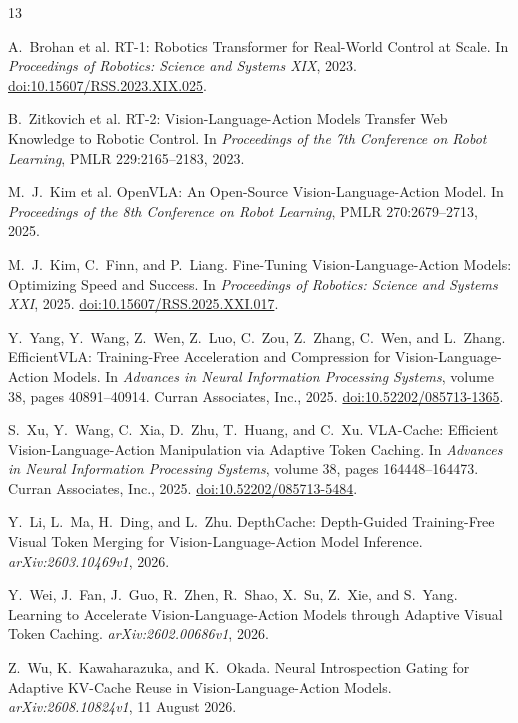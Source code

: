 \documentclass[11pt]{article}
\newcommand{\doi}[1]{\href{https://doi.org/#1}{doi:#1}}
\begin{document}
\begin{thebibliography}{13}

A.~Brohan et al.
\newblock RT-1: Robotics Transformer for Real-World Control at Scale.
\newblock In \emph{Proceedings of Robotics: Science and Systems XIX}, 2023.
\newblock \doi{10.15607/RSS.2023.XIX.025}.

B.~Zitkovich et al.
\newblock RT-2: Vision-Language-Action Models Transfer Web Knowledge to Robotic Control.
\newblock In \emph{Proceedings of the 7th Conference on Robot Learning}, PMLR 229:2165--2183, 2023.

M.~J.~Kim et al.
\newblock OpenVLA: An Open-Source Vision-Language-Action Model.
\newblock In \emph{Proceedings of the 8th Conference on Robot Learning}, PMLR 270:2679--2713, 2025.

M.~J.~Kim, C.~Finn, and P.~Liang.
\newblock Fine-Tuning Vision-Language-Action Models: Optimizing Speed and Success.
\newblock In \emph{Proceedings of Robotics: Science and Systems XXI}, 2025.
\newblock \doi{10.15607/RSS.2025.XXI.017}.

Y.~Yang, Y.~Wang, Z.~Wen, Z.~Luo, C.~Zou, Z.~Zhang, C.~Wen, and L.~Zhang.
\newblock EfficientVLA: Training-Free Acceleration and Compression for Vision-Language-Action Models.
\newblock In \emph{Advances in Neural Information Processing Systems}, volume 38, pages 40891--40914. Curran Associates, Inc., 2025.
\newblock \doi{10.52202/085713-1365}.

S.~Xu, Y.~Wang, C.~Xia, D.~Zhu, T.~Huang, and C.~Xu.
\newblock VLA-Cache: Efficient Vision-Language-Action Manipulation via Adaptive Token Caching.
\newblock In \emph{Advances in Neural Information Processing Systems}, volume 38, pages 164448--164473. Curran Associates, Inc., 2025.
\newblock \doi{10.52202/085713-5484}.

Y.~Li, L.~Ma, H.~Ding, and L.~Zhu.
\newblock DepthCache: Depth-Guided Training-Free Visual Token Merging for Vision-Language-Action Model Inference.
\newblock \emph{arXiv:2603.10469v1}, 2026.

Y.~Wei, J.~Fan, J.~Guo, R.~Zhen, R.~Shao, X.~Su, Z.~Xie, and S.~Yang.
\newblock Learning to Accelerate Vision-Language-Action Models through Adaptive Visual Token Caching.
\newblock \emph{arXiv:2602.00686v1}, 2026.

Z.~Wu, K.~Kawaharazuka, and K.~Okada.
\newblock Neural Introspection Gating for Adaptive KV-Cache Reuse in Vision-Language-Action Models.
\newblock \emph{arXiv:2608.10824v1}, 11 August 2026.


\end{thebibliography}
\end{document}
